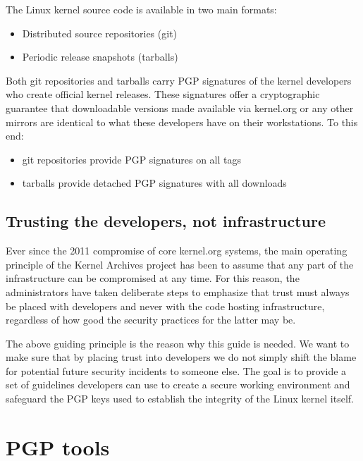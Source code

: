 \documentclass[a4paper,8pt,english]{sphinxmanual}
\begin{document}
The Linux kernel source code is available in two main formats:
\begin{itemize}
\item {} 
Distributed source repositories (git)

\item {} 
Periodic release snapshots (tarballs)

\end{itemize}

Both git repositories and tarballs carry PGP signatures of the kernel
developers who create official kernel releases. These signatures offer a
cryptographic guarantee that downloadable versions made available via
kernel.org or any other mirrors are identical to what these developers
have on their workstations. To this end:
\begin{itemize}
\item {} 
git repositories provide PGP signatures on all tags

\item {} 
tarballs provide detached PGP signatures with all downloads

\end{itemize}


\subsection{Trusting the developers, not infrastructure}
\label{process/maintainer-pgp-guide:trusting-the-developers-not-infrastructure}\label{process/maintainer-pgp-guide:devs-not-infra}
Ever since the 2011 compromise of core kernel.org systems, the main
operating principle of the Kernel Archives project has been to assume
that any part of the infrastructure can be compromised at any time. For
this reason, the administrators have taken deliberate steps to emphasize
that trust must always be placed with developers and never with the code
hosting infrastructure, regardless of how good the security practices
for the latter may be.

The above guiding principle is the reason why this guide is needed. We
want to make sure that by placing trust into developers we do not simply
shift the blame for potential future security incidents to someone else.
The goal is to provide a set of guidelines developers can use to create
a secure working environment and safeguard the PGP keys used to
establish the integrity of the Linux kernel itself.


\section{PGP tools}
\label{process/maintainer-pgp-guide:pgp-tools}\label{process/maintainer-pgp-guide:id1}
\end{document}
